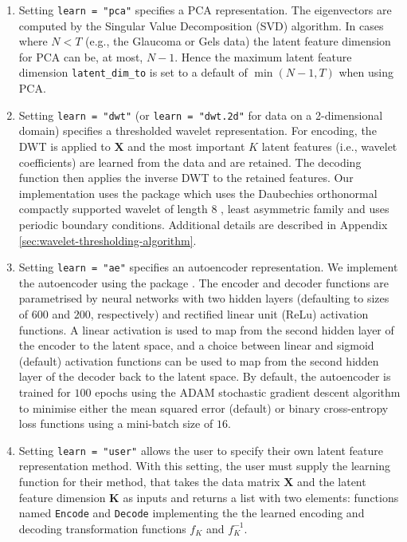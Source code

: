 \begin{enumerate}
    \item Setting \texttt{learn = "pca"} specifies a PCA representation. The eigenvectors are computed by the Singular Value Decomposition (SVD) algorithm. In cases where $N < T$ (e.g., the Glaucoma or Gels data) the latent feature dimension for PCA can be, at most, $N-1$. Hence the maximum latent feature dimension \texttt{latent\_dim\_to} is set to a default of $\min(N-1, T)$ when using PCA.
    \item Setting \texttt{learn = "dwt"} (or \texttt{learn = "dwt.2d"} for data on a 2-dimensional domain) specifies a thresholded wavelet representation. For encoding, the DWT is applied to $\mathbf{X}$ and the most important $K$ latent features (i.e., wavelet coefficients) are learned from the data and are retained. The decoding function then applies the inverse DWT to the retained features. Our implementation uses the   package \parencite{whitcher_waveslim_2024} which uses the Daubechies orthonormal compactly supported wavelet of length $8$ \parencite{daubechies_ten_1992}, least asymmetric family and uses periodic boundary conditions. Additional details are described in Appendix \ref{sec:wavelet-thresholding-algorithm}.
    \item Setting \texttt{learn = "ae"} specifies an autoencoder representation. We implement the autoencoder using the   package \parencite{kalinowski_keras_2024}. The encoder and decoder functions are parametrised by neural networks with two hidden layers (defaulting to sizes of $600$ and $200$, respectively) and rectified linear unit (ReLu) activation functions.
    A linear activation is used to map from the second hidden layer of the encoder to the latent space, and a choice between linear and sigmoid (default) activation functions can be used to map from the second hidden layer of the decoder back to the latent space.
    By default, the autoencoder is trained for $100$ epochs using the ADAM stochastic gradient descent algorithm \parencite{kingma_adam_2017} to minimise either the mean squared error (default) or binary cross-entropy loss functions using a mini-batch size of $16$.
    \item Setting \texttt{learn = "user"} allows the user to specify their own latent feature representation method. With this setting, the user must supply the learning function for their method, that takes the data matrix $\mathbf{X}$ and the latent feature dimension $\mathbf{K}$ as inputs and returns a list with two elements: functions named \texttt{Encode} and \texttt{Decode} implementing the the learned encoding and decoding transformation functions $f_K$ and $f_K^{-1}$.
\end{enumerate}

